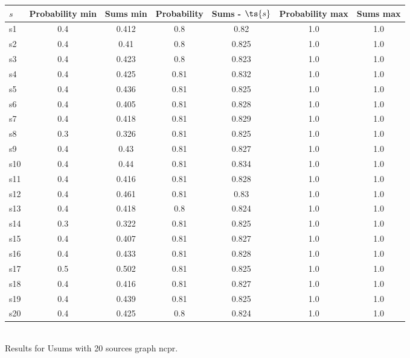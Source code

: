 \documentclass{article}
\begin{document}
\noindent\begin{tabular}{|l|c|c|c|c|c|c|}
\hline
$s$& Probability min & Sums min & Probability & Sums - $\ts{s}$ & Probability max & Sums max\\
\hline
s1 &0.4 & 0.412 & 0.8 & 0.82 & 1.0 & 1.0\\
\hline
s2 &0.4 & 0.41 & 0.8 & 0.825 & 1.0 & 1.0\\
\hline
s3 &0.4 & 0.423 & 0.8 & 0.823 & 1.0 & 1.0\\
\hline
s4 &0.4 & 0.425 & 0.81 & 0.832 & 1.0 & 1.0\\
\hline
s5 &0.4 & 0.436 & 0.81 & 0.825 & 1.0 & 1.0\\
\hline
s6 &0.4 & 0.405 & 0.81 & 0.828 & 1.0 & 1.0\\
\hline
s7 &0.4 & 0.418 & 0.81 & 0.829 & 1.0 & 1.0\\
\hline
s8 &0.3 & 0.326 & 0.81 & 0.825 & 1.0 & 1.0\\
\hline
s9 &0.4 & 0.43 & 0.81 & 0.827 & 1.0 & 1.0\\
\hline
s10 &0.4 & 0.44 & 0.81 & 0.834 & 1.0 & 1.0\\
\hline
s11 &0.4 & 0.416 & 0.81 & 0.828 & 1.0 & 1.0\\
\hline
s12 &0.4 & 0.461 & 0.81 & 0.83 & 1.0 & 1.0\\
\hline
s13 &0.4 & 0.418 & 0.8 & 0.824 & 1.0 & 1.0\\
\hline
s14 &0.3 & 0.322 & 0.81 & 0.825 & 1.0 & 1.0\\
\hline
s15 &0.4 & 0.407 & 0.81 & 0.827 & 1.0 & 1.0\\
\hline
s16 &0.4 & 0.433 & 0.81 & 0.828 & 1.0 & 1.0\\
\hline
s17 &0.5 & 0.502 & 0.81 & 0.825 & 1.0 & 1.0\\
\hline
s18 &0.4 & 0.416 & 0.81 & 0.827 & 1.0 & 1.0\\
\hline
s19 &0.4 & 0.439 & 0.81 & 0.825 & 1.0 & 1.0\\
\hline
s20 &0.4 & 0.425 & 0.8 & 0.824 & 1.0 & 1.0\\
\hline
\end{tabular}\\

\noindent Results for Usums with 20 sources graph ncpr.
\end{document}
